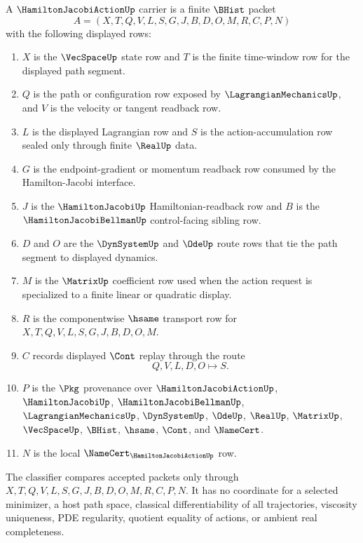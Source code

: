 \begin{definition}
\label{def:hamilton-jacobi-action-carrier}
A $\HamiltonJacobiActionUp$ carrier is a finite $\BHist$ packet
$$
A=(X,T,Q,V,L,S,G,J,B,D,O,M,R,C,P,N)
$$
with the following displayed rows:
\begin{enumerate}
\item $X$ is the $\VecSpaceUp$ state row and $T$ is the finite time-window row for the displayed path segment.
\item $Q$ is the path or configuration row exposed by $\LagrangianMechanicsUp$, and $V$ is the velocity or tangent readback row.
\item $L$ is the displayed Lagrangian row and $S$ is the action-accumulation row sealed only through finite $\RealUp$ data.
\item $G$ is the endpoint-gradient or momentum readback row consumed by the Hamilton-Jacobi interface.
\item $J$ is the $\HamiltonJacobiUp$ Hamiltonian-readback row and $B$ is the $\HamiltonJacobiBellmanUp$ control-facing sibling row.
\item $D$ and $O$ are the $\DynSystemUp$ and $\OdeUp$ route rows that tie the path segment to displayed dynamics.
\item $M$ is the $\MatrixUp$ coefficient row used when the action request is specialized to a finite linear or quadratic display.
\item $R$ is the componentwise $\hsame$ transport row for $X,T,Q,V,L,S,G,J,B,D,O,M$.
\item $C$ records displayed $\Cont$ replay through the route
$$
Q,V,L,D,O \longmapsto S .
$$
\item $P$ is the $\Pkg$ provenance over $\HamiltonJacobiActionUp$, $\HamiltonJacobiUp$, $\HamiltonJacobiBellmanUp$, $\LagrangianMechanicsUp$, $\DynSystemUp$, $\OdeUp$, $\RealUp$, $\MatrixUp$, $\VecSpaceUp$, $\BHist$, $\hsame$, $\Cont$, and $\NameCert$.
\item $N$ is the local $\NameCert_{\HamiltonJacobiActionUp}$ row.
\end{enumerate}
The classifier compares accepted packets only through $X,T,Q,V,L,S,G,J,B,D,O,M,R,C,P,N$. It has no coordinate for a selected minimizer, a host path space, classical differentiability of all trajectories, viscosity uniqueness, PDE regularity, quotient equality of actions, or ambient real completeness.
\end{definition}

